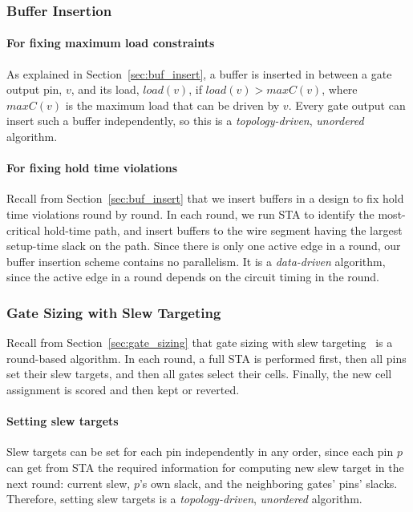 \subsubsection{Buffer Insertion}

\paragraph{For fixing maximum load constraints} As explained in Section~\ref{sec:buf_insert}, a buffer is inserted in between a gate output pin, $v$, and its load, $load(v)$, if $load(v) > maxC(v)$, where $maxC(v)$ is the maximum load that can be driven by $v$.
Every gate output can insert such a buffer independently, so this is a {\em topology-driven}, {\em unordered} algorithm.

\paragraph{For fixing hold time violations} Recall from Section~\ref{sec:buf_insert} that we insert buffers in a design to fix hold time violations round by round. In each round, we run STA to identify the most-critical hold-time path, and insert buffers to the wire segment having the largest setup-time slack on the path. Since there is only one active edge in a round, our buffer insertion scheme contains no parallelism. It is a {\em data-driven} algorithm, since the active edge in a round depends on the circuit timing in the round.

\subsubsection{Gate Sizing with Slew Targeting}

Recall from Section~\ref{sec:gate_sizing} that gate sizing with slew targeting~\cite{Held:Gate} is a round-based algorithm. In each round, a full STA is performed first, then all pins set their slew targets, and then all gates select their cells. Finally, the new cell assignment is scored and then kept or reverted.

\paragraph{Setting slew targets} Slew targets can be set for each pin independently in any order, since each pin $p$ can get from STA the required information for computing new slew target in the next round: current slew, $p$'s own slack, and the neighboring gates' pins' slacks. Therefore, setting slew targets is a {\em topology-driven}, {\em unordered} algorithm.


